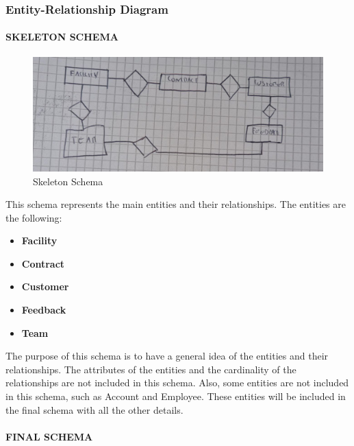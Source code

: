 \subsubsection{Entity-Relationship Diagram}

\paragraph{SKELETON SCHEMA} \leavevmode \newline
\begin{figure}[H]
    \centering
    \includegraphics[width=\textwidth]{images/SkeletonSchema.png}
    \caption{Skeleton Schema}
\end{figure}

\noindent This schema represents the main entities and their relationships. The entities are the following:
\begin{itemize}
    \item \textbf{Facility}
    \item \textbf{Contract}
    \item \textbf{Customer}
    \item \textbf{Feedback}
    \item \textbf{Team}
\end{itemize}
The purpose of this schema is to have a general idea of the entities and their relationships. The attributes of the entities and the cardinality of the relationships are not included in this schema. Also, some entities are not included in this schema, such as Account and Employee. These entities will be included in the final schema with all the other details.

\paragraph{FINAL SCHEMA} \leavevmode \newline

